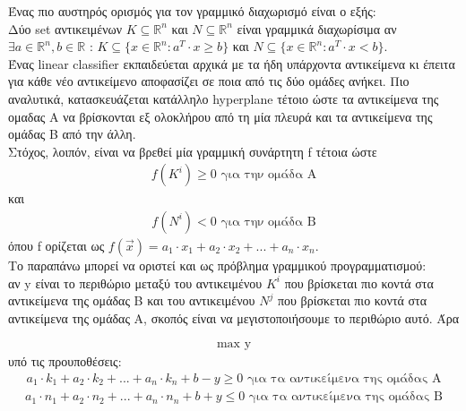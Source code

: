 \documentclass[12pt]{article}
\newcommand{\R}{\mathbb{R}}
\newcommand{\centered}[1]{\begin{align*}#1\end{align*}}
\begin{document}
Ένας πιο αυστηρός ορισμός για τον γραμμικό διαχωρισμό είναι ο εξής: \\
Δύο set αντικειμένων \( K \subseteq \R^{n} \) και \( Ν \subseteq \R^{n} \) είναι γραμμικά διαχωρίσιμα αν \( \exists a \in \R^{n}, b \in \R \) : \(K \subseteq \{ x \in \R^{n} : a^{T} \cdot x \geq b \} \) και \( N \subseteq \{ x \in \R^{n} : a^{T} \cdot x < b\} \). \\



Ένας linear classifier εκπαιδεύεται αρχικά με τα ήδη υπάρχοντα αντικείμενα κι έπειτα για κάθε νέο αντικείμενο αποφασίζει σε ποια από τις δύο ομάδες ανήκει. Πιο αναλυτικά, κατασκευάζεται κατάλληλο hyperplane τέτοιο ώστε τα αντικείμενα της ομαδας Α να βρίσκονται εξ ολοκλήρου από τη μία πλευρά και τα αντικείμενα της ομάδας Β από την άλλη. \\

Στόχος, λοιπόν, είναι να βρεθεί μία γραμμική συνάρτητη f τέτοια ώστε 
\centered{ f(K^{i}) \geq 0 \mbox{ για την ομάδα Α} } 
και
\centered{ f(Ν^{i}) < 0 \mbox{ για την ομάδα Β} }  
όπου f ορίζεται ως \( f(\vec{x}) = a_{1} \cdot x_{1} + a_{2} \cdot x_{2}  + ... + a_{n} \cdot x_{n} \). \\

Το παραπάνω μπορεί να οριστεί και ως πρόβλημα γραμμικού προγραμματισμού: \\
αν y είναι το περιθώριο μεταξύ του αντικειμένου \( K^{i}\) που βρίσκεται πιο κοντά στα αντικείμενα της ομάδας Β και του αντικειμένου \( Ν^{j}\) που βρίσκεται πιο κοντά στα αντικείμενα της ομάδας Α, σκοπός είναι να μεγιστοποιήσουμε το περιθώριο αυτό. Άρα

\centered{\mbox{max y} }
υπό τις προυποθέσεις: \\
\centered{ a_{1} \cdot k_{1} + a_{2} \cdot k_{2}  + ... + a_{n} \cdot k_{n} + b - y \geq 0 \mbox{ για τα αντικείμενα της ομάδας Α} }  
\centered{ a_{1} \cdot n_{1} + a_{2} \cdot n_{2}  + ... + a_{n} \cdot n_{n} + b + y \leq 0 \mbox{ για τα αντικείμενα της ομάδας Β} }  

 
\end{document}
